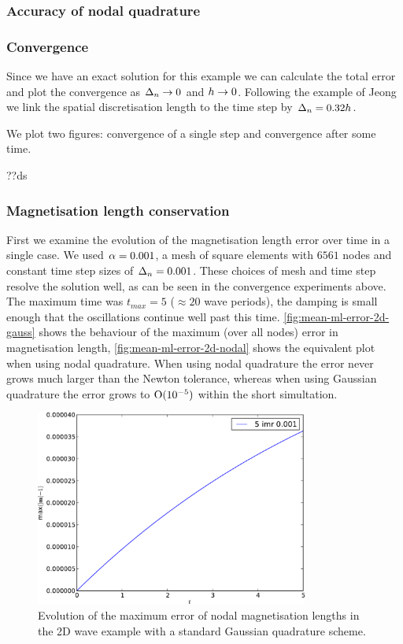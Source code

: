\subsubsection{Accuracy of nodal quadrature}



\subsubsection{Convergence}

Since we have an exact solution for this example we can calculate the total error and plot the convergence as $\Delta_{n} \rightarrow 0$ and $h \rightarrow 0$.
Following the example of Jeong \etal\cite{Jeong2014} we link the spatial discretisation length to the time step by $\Delta_{n} = 0.32h$.

We plot two figures: convergence of a single step and convergence after some time.

??ds


\subsubsection{Magnetisation length conservation}

First we examine the evolution of the magnetisation length error over time in a single case.
We used $\alpha = 0.001$, a mesh of square elements with $6561$ nodes and constant time step sizes of $\Delta_{n} = 0.001$. 
These choices of mesh and time step resolve the solution well, as can be seen in the convergence experiments above.
The maximum time was $t_{max} = 5$ ($\approx 20$ wave periods), the damping is small enough that the oscillations continue well past this time. %
\autoref{fig:mean-ml-error-2d-gauss} shows the behaviour of the maximum (over all nodes) error in magnetisation length, \autoref{fig:mean-ml-error-2d-nodal} shows the equivalent plot when using nodal quadrature.
When using nodal quadrature the error never grows much larger than the Newton tolerance, whereas when using Gaussian quadrature the error grows to $\text{O}(10^{-5})$ within the short simultation.

\begin{figure}[ht!]
  \centering
  \includegraphics[width=0.8\textwidth]{plots/2d_wave_solution_m_length/gauss-maxmathbfm-1vst.pdf}
  \caption{Evolution of the maximum error of nodal magnetisation lengths in the 2D wave example with a standard Gaussian quadrature scheme.}
  \label{fig:mean-ml-error-2d-gauss}
\end{figure}

